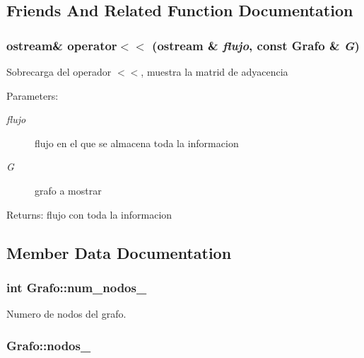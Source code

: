 \subsection{Friends And Related Function Documentation}
\subsubsection{\setlength{\rightskip}{0pt plus 5cm}ostream\& operator$<$$<$ (ostream \& {\em flujo}, const {\bf Grafo} \& {\em G})\hspace{0.3cm}{\tt  [friend]}}\label{classGrafo_a10916bc791b8c23a52309107d104932}


Sobrecarga del operador $<$$<$, muestra la matrid de adyacencia \begin{Desc}
\item[Parameters:]
\begin{description}
\item[{\em flujo}]flujo en el que se almacena toda la informacion \item[{\em G}]grafo a mostrar \end{description}
\end{Desc}
\begin{Desc}
\item[Returns:]flujo con toda la informacion \end{Desc}


\subsection{Member Data Documentation}
\subsubsection{\setlength{\rightskip}{0pt plus 5cm}int {\bf Grafo::num\_\-nodos\_\-}\hspace{0.3cm}{\tt  [private]}}\label{classGrafo_0eb4578d75539d2bddb3c056cc5140f6}


Numero de nodos del grafo. 

\subsubsection{ {\bf Grafo::nodos\_\-}\hspace{0.3cm}{\tt  [private]}}\label{classGrafo_6c9cfc668919f622d4b3ebf3736c67ab}


